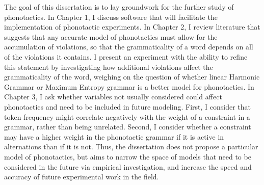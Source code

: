 The goal of this dissertation is to lay groundwork for the further study of phonotactics.
In Chapter 1, I discuss software that will facilitate the implementation of phonotactic
experiments. In Chapter 2, I review literature that suggests that any accurate model of
phonotactics must allow for the accumulation of violations, so that the grammaticality of
a word depends on all of the violations it contains. I present an experiment with the
ability to refine this statement by investigating how additional violations affect the
grammaticality of the word, weighing on the question of whether linear Harmonic Grammar
or Maximum Entropy grammar is a better model for phonotactics.
In Chapter 3, I ask whether variables not usually considered could affect phonotactics and
need to be included in future modeling. First, I consider that token frequency might correlate
negatively with the weight of a constraint in a grammar, rather than being unrelated. Second,
I consider whether a constraint may have a higher weight in the phonotactic grammar if it is
active in alternations than if it is not. Thus, the dissertation does not propose a particular
model of phonotactics, but aims to narrow the space of models that need to be considered
in the future via empirical investigation, and increase the speed and accuracy of future experimental work in the field.


